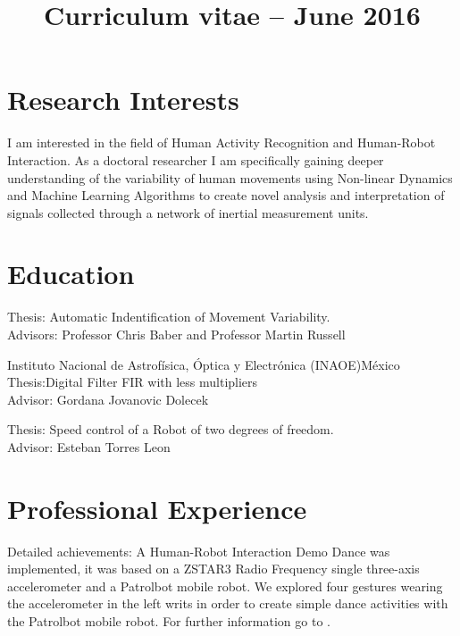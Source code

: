\documentclass[10pt,a4paper,roman]{moderncv}
\title{Curriculum vitae -- June 2016}    %
\begin{document}
\makecvtitle

\section{Research Interests}
I am interested in the field of Human Activity Recognition and Human-Robot Interaction.
As a doctoral researcher I am specifically gaining deeper understanding of the variability
of human movements using Non-linear Dynamics and Machine Learning Algorithms
to create novel analysis and interpretation of signals collected through a network of inertial measurement units.


\section{Education}

  {Thesis: Automatic Indentification of Movement Variability.
   \\ Advisors: Professor Chris Baber and  Professor Martin Russell  }

  {Instituto Nacional de Astrof\'isica, \'Optica y Electr\'onica (INAOE)}{M\'exico}{}
  {Thesis:Digital Filter FIR with less multipliers
  \href{https://sites.google.com/site/perezxochicale/docs/MScThesis.pdf}{\faFilePdfO}
  \\ Advisor: Gordana Jovanovic Dolecek}

  {Thesis: Speed control of a Robot of two degrees of freedom.
  \href{https://sites.google.com/site/perezxochicale/docs/BachelorProject.pdf}{\faFilePdfO}
  \\ Advisor: Esteban Torres Leon}


\section{Professional Experience}

{Detailed achievements: A Human-Robot Interaction Demo Dance was implemented, it was based on a
ZSTAR3 Radio Frequency single three-axis accelerometer and a Patrolbot mobile robot.
We explored four gestures wearing the accelerometer in the left writs
in order to create simple dance activities with the Patrolbot mobile robot.
For further information go to \href{https://sites.google.com/site/perezxochicale/projects/demodance}{\faExternalLink}.}
\end{document}
